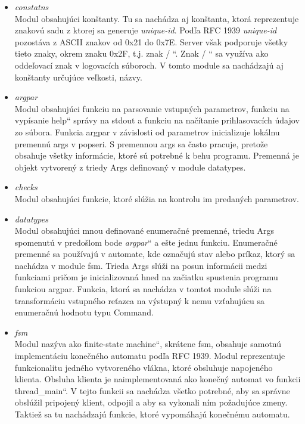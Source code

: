 \documentclass[11pt,a4paper]{article}
\providecommand{\uv}[1]{\quotedblbase #1\textquotedblleft}
\begin{document}
		\begin{itemize}

			\item \textit{constatns}\\[0.4em]
				Modul obsahujúci konštanty. Tu sa nachádza aj konštanta, ktorá reprezentuje znakovú sadu z ktorej sa generuje \textit{unique-id}. Podľa RFC 1939 \textit{unique-id} pozostáva z ASCII znakov od 0x21 do 0x7E. Server však podporuje všetky tieto znaky, okrem znaku 0x2F, t.j. znak \uv{ / }. Znak \uv{ / } sa využíva ako oddeľovací znak v logovacích súboroch. V tomto module sa nachádzajú aj konštanty určujúce veľkosti, názvy.

			\item \textit{argpar}\\[0.4em]
				Modul obsahujúci funkciu na parsovanie vstupných parametrov, funkciu na vypísanie \uv{help} správy na stdout a funkciu na načítanie prihlasovacích údajov zo súbora. Funkcia argpar v závislosti od parametrov inicializuje lokálnu premennú args v popseri. S premennou args sa často pracuje, pretože obsahuje všetky informácie, ktoré sú potrebné k behu programu. Premenná je objekt vytvorený z triedy Args definovaný v module datatypes.

			\item \textit{checks}\\[0.4em]
				Modul obsahujúci funkcie, ktoré slúžia na kontrolu im predaných parametrov.

			\item \textit{datatypes}\\[0.4em]
				Modul obsahujúci mnou definované enumeračné premenné, triedu Args spomenutú v predošlom bode \uv{\textit{argpar}} a ešte jednu funkciu. Enumeračné premenné sa používajú v automate, kde označujú stav alebo príkaz, ktorý sa nachádza v module fsm. Trieda Args slúži na posun informácii medzi funkciami pričom je inicializovaná hned na začiatku spustenia programu funkciou argpar. Funkcia, ktorá sa nachádza v tomtot module slúži na transformáciu vstupného reťazca na výstupný k nemu vzťahujúcu sa enumeračnú hodnotu typu Command.

			\item \textit{fsm}\\[0.4em]
				Modul nazýva ako \uv{finite-state machine}, skrátene fsm, obsahuje samotnú implementáciu konečného automatu podľa RFC 1939. Modul reprezentuje funkcionalitu jedného vytvoreného vlákna, ktoré obsluhuje napojeného klienta. Obsluha klienta je naimplementovaná ako konečný automat vo funkcii \uv{thread\_main}. V tejto funkcii sa nachádza všetko potrebné, aby sa správne obslúžil pripojený klient, odpojil a aby sa vykonali ním požadujúce zmeny. Taktiež sa tu nachádzajú funkcie, ktoré vypomáhajú konečnému automatu.


\end{itemize}
\end{document}
